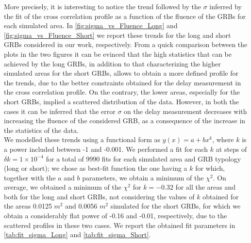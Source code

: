 \documentclass[]{spie}  %
\def \mq{$m^{2}$\xspace}
\begin{document}
More precisely, it is interesting to notice the trend followed by the $\sigma$ inferred by the fit of the cross correlation profile as a function of the fluence of the GRBs for each simulated area. In \autoref{fig:sigma_vs_Fluence_Long} and \autoref{fig:sigma_vs_Fluence_Short} we report these trends for the long and short GRBs considered in our work, respectively.
From a quick comparison between the plots in the two figures it can be evinced that the high statistics that can be achieved by the long GRBs, in addition to that characterizing the higher simulated areas for the short GRBs, allows to obtain a more defined profile for the trends, due to the better constraints obtained for the delay measurement in the cross correlation profile. On the contrary, the lower areas, especially for the short GRBs, implied a scattered distribution of the data. However, in both the cases it can be inferred that the error $\sigma$ on the delay measurement decreases with increasing the fluence of the considered GRB, as a consequence of the increase in the statistics of the data. \\
We modelled these trends using a functional form as $y(x)=a+bx^k$, where $k$ is a power included between -1 and -0.001. We performed a fit for each $k$ at steps of $\delta k =1\times 10^{-4}$ for a total of 9990 fits for each simulated area and GRB typology (long or short); we chose as best-fit function the one having a $k$ for which, together with the $a$ and $b$ parameters, we obtain a minimum of the $\chi^2$. 
On average, we obtained a minimum of the $\chi^2$ for $k=-0.32$ for all the areas and both for the long and short GRBs, not considering the values of $k$ obtained for the areas 0.0125 \mq and 0.0056 \mq simulated for the short GRBs, for which we obtain a considerably flat power of -0.16 and -0.01, respectively, due to the scattered profiles in these two cases. We report the obtained fit parameters in \autoref{tab:fit_sigma_Long} and \autoref{tab:fit_sigma_Short}.
\end{document}
